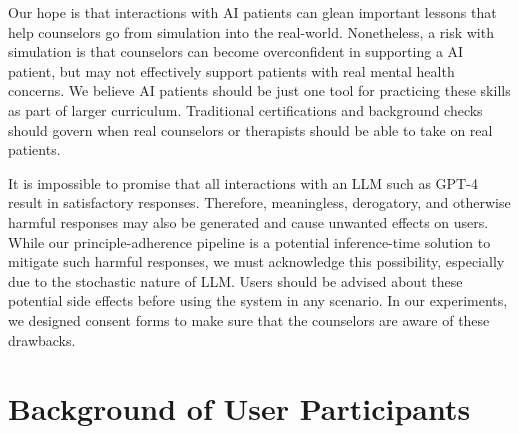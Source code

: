 \documentclass[11pt]{article}
\newcommand{\cheng}[1]{\ifthenelse{\boolean{showcomments}}{\textcolor{purple}{[#1 —cheng]}}{}}
\begin{document}
Our hope is that interactions with AI patients can glean important lessons that help counselors go from simulation into the real-world.  Nonetheless, a risk with simulation is that counselors can become overconfident in supporting a AI patient, but may not effectively support patients with real mental health concerns. We believe AI patients should be just one tool for practicing these skills as part of larger curriculum. Traditional certifications and background checks should govern when real counselors or therapists should be able to take on real patients. 


It is impossible to promise that all interactions with an LLM such as GPT-4 result in satisfactory responses. Therefore, meaningless, derogatory, and otherwise harmful responses may also be generated and cause unwanted effects on users. While our principle-adherence pipeline is a potential inference-time solution to mitigate such harmful responses, we must acknowledge this possibility, especially due to the stochastic nature of LLM. Users should be advised about these potential side effects before using the system in any scenario. In our experiments, we designed consent forms to make sure that the counselors are aware of these drawbacks.



% 

\appendix
\newpage




\section{Background of User Participants} \label{sec:participant-background}
\end{document}
